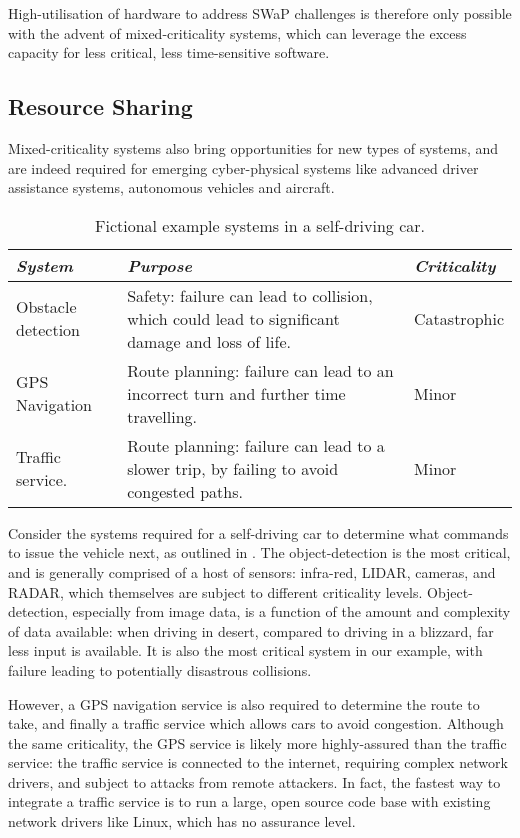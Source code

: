 High-utilisation of hardware to address SWaP challenges is therefore only possible with the advent
of mixed-criticality systems, which can leverage the excess capacity for less critical, less time-sensitive
software.

\subsection{Resource Sharing}

Mixed-criticality systems also bring opportunities for new types of
systems, and are indeed required for emerging cyber-physical systems like
advanced driver assistance systems, autonomous vehicles and aircraft.

\begin{table} 
\centering
\begin{tabularx}{\textwidth}{lXl}\toprule
    \emph{System}            & \emph{Purpose}                                                           & \emph{Criticality} \\\midrule
     Obstacle detection      & Safety: failure can lead to collision, which could lead to significant
    damage and loss of life. & Catastrophic    \\
    \gls{GPS} Navigation          & Route planning:  failure can lead to an incorrect turn and further
    time travelling.         & Minor \\
     Traffic service.        & Route planning: failure can lead to a slower trip, by failing to
    avoid congested paths.
    & Minor \\
    \bottomrule
\end{tabularx}
\caption{Fictional example systems in a self-driving car.}
\label{tab:self-driving-car}
\end{table}

Consider the systems required for a self-driving car to determine what commands to issue the vehicle
next, as outlined in . The object-detection is the most critical, and is
generally comprised of a host of sensors: infra-red, LIDAR, cameras, and RADAR, which themselves
are subject to different criticality levels. Object-detection,
especially from image data, is a function of the amount and complexity of data available: when
driving in desert, compared to driving in a blizzard, far less input is available. It is also the
most critical system in our example, with failure leading to potentially disastrous collisions.

However, a GPS navigation service is also required to determine the route to take, and finally a
traffic service which allows cars to avoid congestion. Although the same criticality, the GPS
service is likely more highly-assured than the traffic service: the traffic service is connected to
the internet, requiring complex network drivers, and subject to attacks from remote attackers. 
In fact, the fastest way to integrate a traffic service is to run a large, open source code base
with existing network drivers like Linux, which has no assurance level. 

